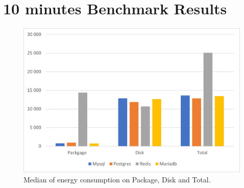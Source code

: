 \chapter{10 minutes Benchmark Results}
\label{app:10mBench}

\begin{figure}[h]
\centering
\includegraphics[width=0.8\columnwidth]{results/median/10m/energy.png}
\caption{Median of energy consumption on Package, Disk and Total.}
\label{fig:medianenergy10m}
\end{figure}


